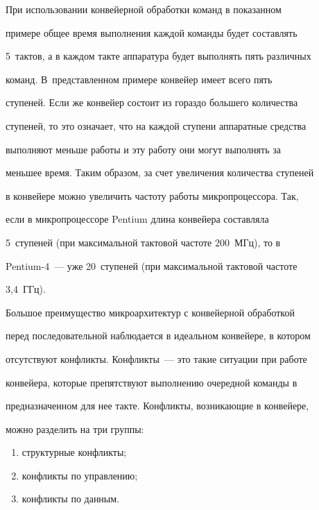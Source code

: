 







При использовании конвейерной обработки команд в показанном 


примере общее время выполнения каждой команды будет составлять 


5~тактов, а в каждом такте аппаратура будет выполнять пять различных 


команд. В~представленном примере конвейер имеет всего пять 


ступеней. Если же конвейер состоит из гораздо большего количества 


ступеней, то это означает, что на каждой ступени аппаратные средства 


выполняют меньше работы и эту работу они могут выполнять за 


меньшее время. Таким образом, за счет увеличения количества ступеней 


в конвейере можно увеличить частоту работы микропроцессора. Так, 


если в микропроцессоре Pentium длина конвейера составляла 


5~ступеней (при максимальной тактовой частоте 200~МГц), то в 


Pentium-4~--- уже 20~ступеней (при максимальной тактовой частоте 


3,4~ГГц).


   


 Большое преимущество микроархитектур с конвейерной обработкой 


перед последовательной наблюдается в идеальном конвейере, в котором 


отсутствуют конфликты. Конфликты~--- это такие ситуации при работе 


конвейера, которые препятствуют выполнению очередной команды в 


предназначенном для нее такте. Конфликты, возникающие в конвейере, 


можно разделить на три группы:


 \begin{enumerate}[(1)]


\item  структурные конфликты;


   \item конфликты по управлению;


\item конфликты по данным.


\end{enumerate}





